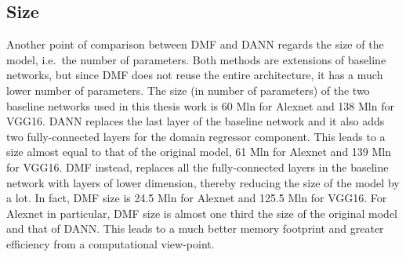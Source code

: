 \documentclass[../main.tex]{subfiles}
\begin{document}
    \subsection{Size}
	Another point of comparison between DMF and DANN regards the size of the model, i.e.\ the number of parameters. Both methods
	are extensions of baseline networks, but since DMF does not reuse the entire architecture, it has a much lower number of parameters.
	The size (in number of parameters) of the two baseline networks used in this thesis work is 60 Mln for Alexnet and 138 Mln for
	VGG16. DANN replaces the last layer of the baseline network and it also adds two fully-connected layers for the domain
    regressor component. This leads to a size almost equal to that of the original model, 61 Mln for Alexnet and 139 Mln for VGG16.
    DMF instead, replaces all the fully-connected layers in the baseline network with layers of lower dimension, thereby reducing
    the size of the model by a lot. In fact, DMF size is 24.5 Mln for Alexnet and 125.5 Mln for VGG16. For Alexnet in particular,
    DMF size is almost one third the size of the original model and that of DANN\@. This leads to a much better memory footprint
    and greater efficiency from a computational view-point.
\end{document}
